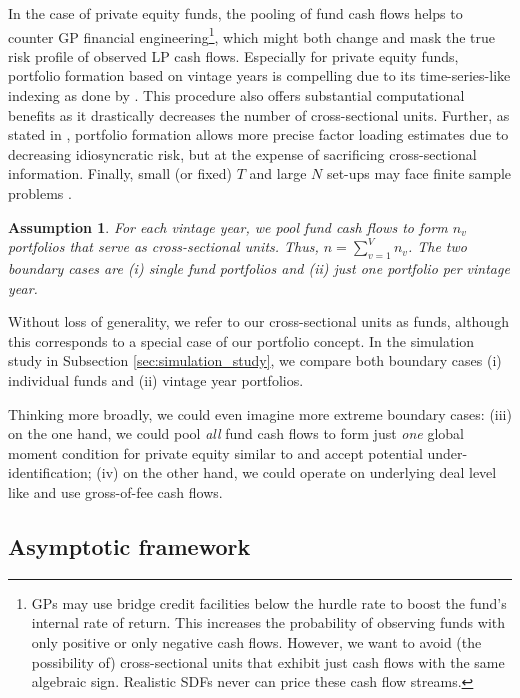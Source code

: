 \documentclass[12pt]{article}
\newtheorem{assume}{Assumption}
\begin{document}
In the case of private equity funds, the pooling of fund cash flows helps to counter GP financial engineering\footnote{GPs may use bridge credit facilities below the hurdle rate to boost the fund's internal rate of return. This increases the probability of observing funds with only positive or only negative cash flows. However, we want to avoid (the possibility of) cross-sectional units that exhibit just cash flows with the same algebraic sign. Realistic SDFs never can price these cash flow streams.}, which might both change and mask the true risk profile of observed LP cash flows.
Especially for private equity funds, portfolio formation based on vintage years is compelling due to its time-series-like indexing as done by \cite{DLP12}.
This procedure also offers substantial computational benefits as it drastically decreases the number of cross-sectional units.
Further, as stated in \cite{ALS20}, portfolio formation allows more precise factor loading estimates due to decreasing idiosyncratic risk, but at the expense of sacrificing cross-sectional information.
Finally, small (or fixed) $T$ and large $N$ set-ups may face finite sample problems \citep{RRZ20}.
\begin{assume}
	\label{as:portfolio}
	For each vintage year, we pool fund cash flows to form $n_v$ portfolios that serve as cross-sectional units.
	Thus, $n = \sum_{v=1}^V n_v$.
	The two boundary cases are (i) single fund portfolios and (ii) just one portfolio per vintage year. 
\end{assume}
Without loss of generality, we refer to our cross-sectional units as funds, although this corresponds to a special case of our portfolio concept.
In the simulation study in Subsection \ref{sec:simulation_study}, we compare both boundary cases (i) individual funds and (ii) vintage year portfolios.

Thinking more broadly, we could even imagine more extreme boundary cases: 
(iii) on the one hand, we could pool \emph{all} fund cash flows to form just \emph{one} global moment condition for private equity similar to \cite{KN16} and accept potential under-identification; 
(iv) on the other hand, we could operate on underlying deal level like \cite{B14,B16a,B16b} and use gross-of-fee cash flows.

\subsection{Asymptotic framework}
\label{sec:asymptotic_framework}
\end{document}
